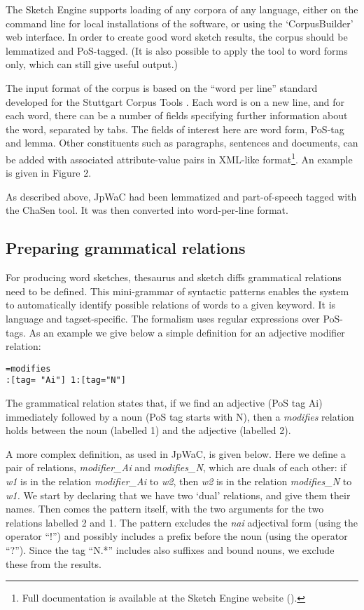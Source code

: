 \documentclass[english]{jnlp_1.4}
\newcommand{\url}[1]{}
\begin{document}
The Sketch Engine supports loading of any corpora of any language,
either on the command line for local installations of the software, or
using the `CorpusBuilder' web interface. In order to create good word
sketch results, the corpus should be lemmatized and PoS-tagged. (It is
also possible to apply the tool to word forms only, which can still
give useful output.)

The input format of the corpus is based on the ``word per line''
standard developed for the Stuttgart Corpus Tools . Each
word is on a new line, and for each word, there can be a number of
fields specifying further information about the word, separated by
tabs. The fields of interest here are word form, PoS-tag and
lemma. Other constituents such as paragraphs, sentences and documents,
can be added with associated attribute-value pairs in XML-like
format\footnote{
	Full documentation is available at the Sketch Engine
website (\url{http://www.skechengine.co.uk}).
}. An example is given in
Figure 2.

As described above, JpWaC had been lemmatized and part-of-speech
tagged with the ChaSen tool. It was then converted into word-per-line
format.


\subsection{Preparing grammatical relations}

For producing word sketches, thesaurus and sketch diffs grammatical
relations need to be defined. This mini-grammar of syntactic patterns
enables the system to automatically identify possible relations of
words to a given keyword. It is language and tagset-specific. The
formalism uses regular expressions over PoS-tags. As an example we
give below a simple definition for an adjective modifier relation:

\texttt{=modifies\\
\indent{}:[tag= "Ai"] 1:[tag="N"]
}

The grammatical relation states that, if we find an adjective (PoS tag
Ai) immediately followed by a noun (PoS tag starts with N), then a
\textit{modifies} relation holds between the noun (labelled 1) and the
adjective (labelled 2).

A more complex definition, as used in JpWaC, is given below. Here we define a pair of relations, \textit{modifier\_Ai }and \textit{modifies\_N}, which are duals of each other: if \textit{w1} is in the relation \textit{modifier\_Ai} to \textit{w2}, then \textit{w2} is in the relation \textit{modifies\_N }to \textit{w1. }We start by declaring that we have two `dual' relations, and give them their names. Then comes the pattern itself, with the two arguments for the two relations labelled 2 and 1. The pattern excludes the \textit{nai} adjectival form (using the operator ``!'') and possibly includes a prefix before the noun (using the operator ``?''). Since the tag ``N.*'' includes also suffixes and bound nouns, we exclude these from the results.
\end{document}
